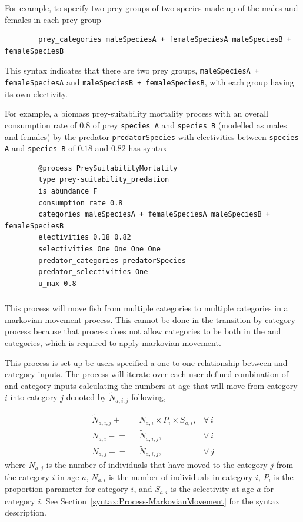 For example, to specify two prey groups of two species made up of the males and females in each prey group

{\small{\begin{verbatim}
		prey_categories maleSpeciesA + femaleSpeciesA maleSpeciesB + femaleSpeciesB
\end{verbatim}}}

This syntax indicates that there are two prey groups, \texttt{maleSpeciesA + femaleSpeciesA} and \texttt{maleSpeciesB + femaleSpeciesB}, with each group having its own electivity.

For example, a biomass prey-suitability mortality process with an overall consumption rate of $0.8$ of prey \texttt{species A} and \texttt{species B} (modelled as males and females) by the predator \texttt{predatorSpecies} with electivities between \texttt{species A} and \texttt{species B} of $0.18$ and $0.82$ has syntax

{\small{\begin{verbatim}
		@process PreySuitabilityMortality
		type prey-suitability_predation
		is_abundance F
		consumption_rate 0.8
		categories maleSpeciesA + femaleSpeciesA maleSpeciesB + femaleSpeciesB
		electivities 0.18 0.82
		selectivities One One One One
		predator_categories predatorSpecies
		predator_selectivities One
		u_max 0.8
\end{verbatim}}}

\subsubsection{}\label{sec:Process-MarkovianMovement}
This process will move fish from multiple categories to multiple categories in a markovian movement process. This cannot be done in the transition by category process because that process does not allow categories to be both in the  and  categories, which is required to apply markovian movement.

This process is set up be users specified a one to one relationship between  and  category inputs. The process will iterate over each user defined combination of  and  category inputs calculating the numbers at age that will move from category \(i\) into category \(j\) denoted by \(\tilde{N}_{a,i,j}\) following,

\begin{align}
	\tilde{N}_{a,i,j} \mathrel{+}=& N_{a,i} \times P_i \times S_{a,i}, & \forall \ i \\
	N_{a,i} \mathrel{-}=& \tilde{N}_{a,i,j}, & \forall \ i \\
	N_{a,j} \mathrel{+}=& \tilde{N}_{a,i,j}, & \forall \ j
\end{align}
where $N_{a,j}$ is the number of individuals that have moved to the  category $j$ from the  category $i$ in age $a$, $N_{a,i}$ is the number of individuals in category $i$, $P_i$ is the proportion parameter for category $i$, and $S_{a,i}$ is the selectivity at age $a$ for category $i$. See Section~\ref{syntax:Process-MarkovianMovement} for the syntax description. 


